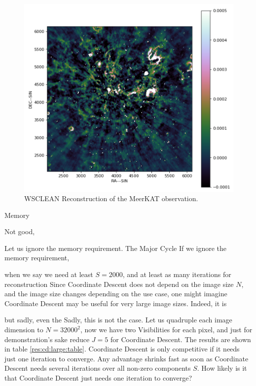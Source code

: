 \begin{figure}[h]
	\centering
	\includegraphics[width=0.6\linewidth]{./chapters/20.results/meerkat.png}
	\caption{WSCLEAN Reconstruction of the MeerKAT observation.}
	\label{results:wsclean}
\end{figure}


Memory

Not good, 

Let us ignore the memory requirement. The Major Cycle 
If we ignore the memory requirement, 

when we say we need at least $S=2000$, and at least as many iterations for reconstruction
Since Coordinate Descent does not depend on the image size $N$, and the image size changes depending on the use case, one might imagine Coordinate Descent may be useful for very large image sizes. Indeed, it is

but sadly, even the  Sadly, this is not the case. Let us quadruple each image dimension to $N=32000^2$, now we have two Visibilities for each pixel, and just for demonstration's sake reduce $J=5$ for Coordinate Descent. The results are shown in table \ref{res:cd:large:table}. Coordinate Descent is only competitive if it needs just one iteration to converge. Any advantage shrinks fast as soon as Coordinate Descent needs several iterations over all non-zero components $S$. How likely is it that Coordinate Descent just needs one iteration to converge?

